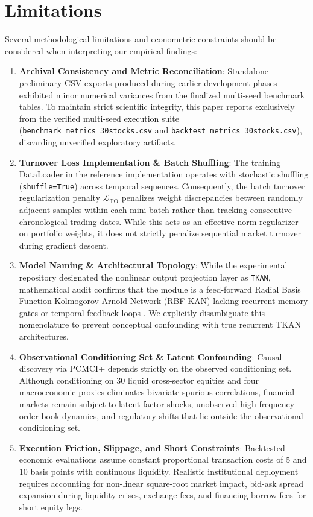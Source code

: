 \documentclass[10pt,twocolumn,a4paper]{article}
\begin{document}
\section{Limitations}
\label{sec:limitations}
Several methodological limitations and econometric constraints should be considered when interpreting our empirical findings:
\begin{enumerate}
    \item \textbf{Archival Consistency and Metric Reconciliation}: Standalone preliminary CSV exports produced during earlier development phases exhibited minor numerical variances from the finalized multi-seed benchmark tables. To maintain strict scientific integrity, this paper reports exclusively from the verified multi-seed execution suite (\texttt{benchmark\_metrics\_30stocks.csv} and \texttt{backtest\_metrics\_30stocks.csv}), discarding unverified exploratory artifacts.
    \item \textbf{Turnover Loss Implementation \& Batch Shuffling}: The training DataLoader in the reference implementation operates with stochastic shuffling (\texttt{shuffle=True}) across temporal sequences. Consequently, the batch turnover regularization penalty $\mathcal{L}_{\mathrm{TO}}$ penalizes weight discrepancies between randomly adjacent samples within each mini-batch rather than tracking consecutive chronological trading dates. While this acts as an effective norm regularizer on portfolio weights, it does not strictly penalize sequential market turnover during gradient descent.
    \item \textbf{Model Naming \& Architectural Topology}: While the experimental repository designated the nonlinear output projection layer as \texttt{TKAN}, mathematical audit confirms that the module is a feed-forward Radial Basis Function Kolmogorov-Arnold Network (RBF-KAN) lacking recurrent memory gates or temporal feedback loops \cite{genet2024tkan}. We explicitly disambiguate this nomenclature to prevent conceptual confounding with true recurrent TKAN architectures.
    \item \textbf{Observational Conditioning Set \& Latent Confounding}: Causal discovery via PCMCI+ depends strictly on the observed conditioning set. Although conditioning on 30 liquid cross-sector equities and four macroeconomic proxies eliminates bivariate spurious correlations, financial markets remain subject to latent factor shocks, unobserved high-frequency order book dynamics, and regulatory shifts that lie outside the observational conditioning set.
    \item \textbf{Execution Friction, Slippage, and Short Constraints}: Backtested economic evaluations assume constant proportional transaction costs of 5 and 10 basis points with continuous liquidity. Realistic institutional deployment requires accounting for non-linear square-root market impact, bid-ask spread expansion during liquidity crises, exchange fees, and financing borrow fees for short equity legs.

\end{enumerate}
\end{document}
